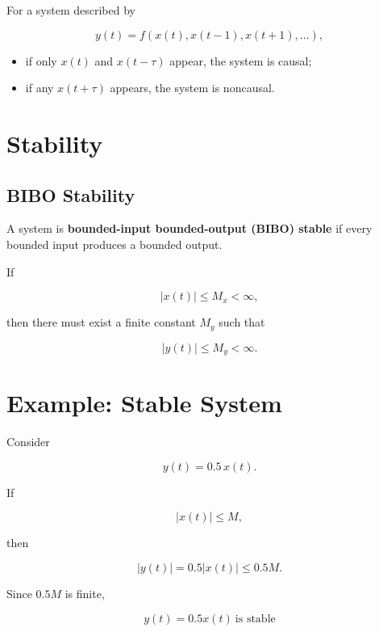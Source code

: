 For a system described by

\[
y(t)=f(x(t),x(t-1),x(t+1),\ldots),
\]

\begin{itemize}
\item if only \(x(t)\) and \(x(t-\tau)\) appear, the system is causal;
\item if any \(x(t+\tau)\) appears, the system is noncausal.
\end{itemize}


\section{Stability}


\subsection{BIBO Stability}

A system is \textbf{bounded-input bounded-output (BIBO) stable} if every bounded
input produces a bounded output.

If

\[
|x(t)|\le M_x<\infty,
\]

then there must exist a finite constant \(M_y\) such that

\[
|y(t)|\le M_y<\infty.
\]


\section{Example: Stable System}

Consider

\[
y(t)=0.5\,x(t).
\]

If

\[
|x(t)|\le M,
\]

then

\[
|y(t)|=0.5|x(t)|\le 0.5M.
\]

Since \(0.5M\) is finite,

\[
\boxed{
y(t)=0.5x(t)\ \text{is stable}
}
\]


